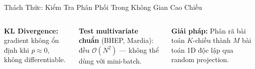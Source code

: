 \documentclass[aspectratio=169,9pt]{beamer}
\begin{document}
\begin{frame}{Thách Thức: Kiểm Tra Phân Phối Trong Không Gian Cao Chiều}
\begin{columns}[T]
\vspace{0.4em}
\begin{badbox}
\footnotesize \textbf{KL Divergence:} gradient không ổn định khi $p\approx 0$, không differentiable.
\end{badbox}

\vspace{0.4em}
\begin{badbox}
\footnotesize \textbf{Test multivariate chuẩn} (BHEP, Mardia): đều $\mathcal{O}(N^2)$ — không thể dùng với mini-batch.
\end{badbox}

\vspace{0.5em}
\begin{accentbox}
\footnotesize \textbf{Giải pháp:} Phân rã bài toán $K$-chiều thành $M$ bài toán 1D độc lập qua random projection.
\end{accentbox}

\end{columns}

\end{frame}
\end{document}
